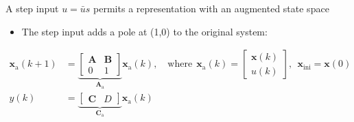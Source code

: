 \documentclass[presentation]{beamer}
\begin{document}
\begin{frame}[label={slide:preliminaries3}]{A step input ${u} = \bar{{u}} s$ permits a representation \linebreak with an augmented state space }
\begin{itemize}
\item The step input adds a pole at (1,0) to the original system: 
\end{itemize}
\begin{equation*} \begin{aligned} \mathbf{x}_\text{a}(k+1) &= \underbrace{ \begin{bmatrix} \mathbf{A} & \mathbf{B} \\ 0 & 1 \end{bmatrix} }_{\mathbf{A}_\text{a}} \mathbf{x}_\text{a}(k) , \quad \text{where} \ \ \mathbf{x}_\text{a}(k) = \begin{bmatrix} \mathbf{x}(k) \\ {u}(k) \end{bmatrix}, \ \ \mathbf{x}_{\text{ini}} = \mathbf{x}(0) \\
{y}(k) &= \underbrace{ \begin{bmatrix} \mathbf{C} & D \end{bmatrix} }_{\mathbf{C}_\text{a}} \mathbf{x}_\text{a}(k) \end{aligned} \end{equation*}
\end{frame}
\end{document}
